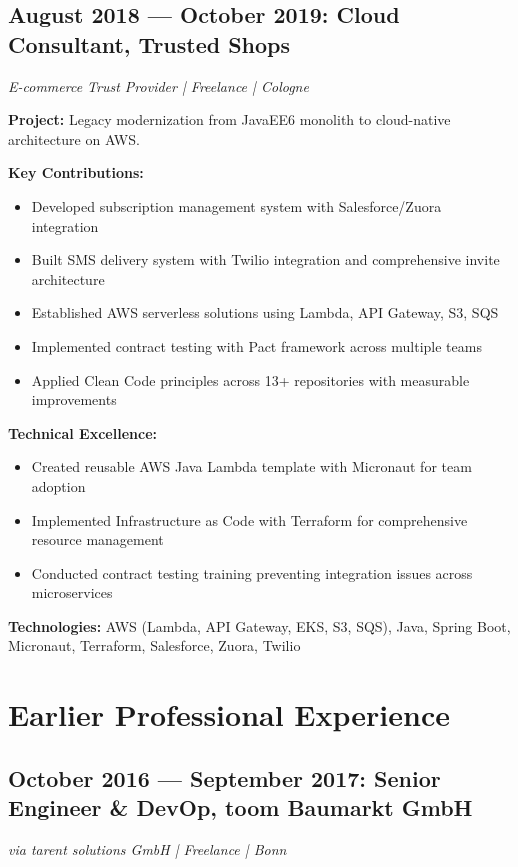\documentclass[11pt,a4paper]{article}
\begin{document}
\subsection{August 2018 — October 2019: Cloud Consultant, Trusted Shops}
\textit{E-commerce Trust Provider | Freelance | Cologne}

\textbf{Project:} Legacy modernization from JavaEE6 monolith to cloud-native architecture on AWS.

\textbf{Key Contributions:}
\begin{itemize}[leftmargin=12pt,topsep=0pt,itemsep=0pt]
\item Developed subscription management system with Salesforce/Zuora integration
\item Built SMS delivery system with Twilio integration and comprehensive invite architecture
\item Established AWS serverless solutions using Lambda, API Gateway, S3, SQS
\item Implemented contract testing with Pact framework across multiple teams
\item Applied Clean Code principles across 13+ repositories with measurable improvements
\end{itemize}

\textbf{Technical Excellence:}
\begin{itemize}[leftmargin=12pt,topsep=0pt,itemsep=0pt]
\item Created reusable AWS Java Lambda template with Micronaut for team adoption
\item Implemented Infrastructure as Code with Terraform for comprehensive resource management
\item Conducted contract testing training preventing integration issues across microservices
\end{itemize}

\textbf{Technologies:} AWS (Lambda, API Gateway, EKS, S3, SQS), Java, Spring Boot, Micronaut, Terraform, Salesforce, Zuora, Twilio

\newpage

\section{Earlier Professional Experience}

\subsection{October 2016 — September 2017: Senior Engineer \& DevOp, toom Baumarkt GmbH}
\textit{via tarent solutions GmbH | Freelance | Bonn}
\end{document}
